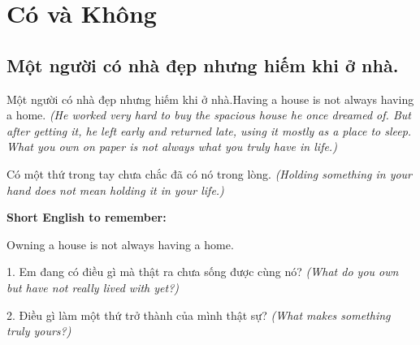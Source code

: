 \chapter{Có và Không}

\section{Một người có nhà đẹp nhưng hiếm khi ở nhà.}
\begin{truyen}{Một người có nhà đẹp nhưng hiếm khi ở nhà.}{Having a house is not always having a home.}
\textit{(He worked very hard to buy the spacious house he once dreamed of. But after getting it, he left early and returned late, using it mostly as a place to sleep. What you own on paper is not always what you truly have in life.)}
\end{truyen}
\begin{baihoc}
Có một thứ trong tay chưa chắc đã có nó trong lòng.
\textit{(Holding something in your hand does not mean holding it in your life.)}
\end{baihoc}
\begin{ghinhoanh}
\textbf{Short English to remember:}

Owning a house is not always having a home.
\end{ghinhoanh}
\begin{tuhocnhanh}
1. Em đang có điều gì mà thật ra chưa sống được cùng nó? \textit{(What do you own but have not really lived with yet?)}

2. Điều gì làm một thứ trở thành của mình thật sự? \textit{(What makes something truly yours?)}
\end{tuhocnhanh}
\ngancach


